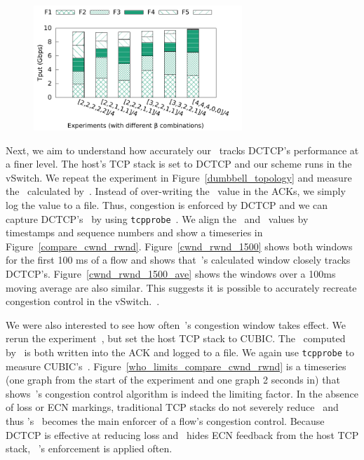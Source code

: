 \begin{figure}[!t]
        \centering
  \includegraphics[width=0.7\textwidth]{acdctcp/figures/qos/qos_stacked.pdf}
        \caption{}
        \label{cc-qos}
\end{figure}

Next, we aim to understand how accurately our~\acdc{} tracks DCTCP's performance at a finer level. The host's TCP
stack is set to DCTCP and our scheme runs in the vSwitch.
We repeat the experiment in Figure~\ref{dumbbell_topology} and measure the~\rwnd{} calculated by~\acdc{}. Instead
of over-writing the~\rwnd{} value in the ACKs, we simply log the value to a file. Thus, congestion is enforced by DCTCP
and we can capture DCTCP's~\cwnd{} by using {\tt tcpprobe}~\cite{tcp-probe}. We align the~\rwnd{} and~\cwnd{} values by timestamps and sequence
numbers and show a timeseries in Figure~\ref{compare_cwnd_rwnd}. Figure~\ref{cwnd_rwnd_1500} shows both windows for the
first 100 ms of a flow and shows that~\acdc{}'s calculated window closely tracks DCTCP's. Figure~\ref{cwnd_rwnd_1500_ave} 
shows the windows over a 100ms moving average are also similar. This suggests it is possible to accurately recreate congestion
control in the vSwitch.~.

We were also interested to see how often~\acdc{}'s congestion window takes effect. We rerun the experiment~, but set
the host TCP stack to CUBIC. The~\rwnd{} computed by~\acdc{} is both written into the ACK and logged to a file. We again
use {\tt tcpprobe} to measure CUBIC's~\cwnd{}. Figure~\ref{who_limits_compare_cwnd_rwnd} is a timeseries (one graph from the
start of the experiment and one graph 2 seconds in) that shows~\acdc{}'s
congestion control algorithm is indeed the limiting factor.
In the absence of loss or ECN markings, traditional TCP stacks do not severely reduce~\cwnd{} and thus
\acdc{}'s~\rwnd{} becomes the main enforcer of a flow's congestion control. Because DCTCP 
is effective at reducing loss and~\acdc{} hides ECN feedback from the host TCP stack,
~\acdc{}'s enforcement is applied often.

